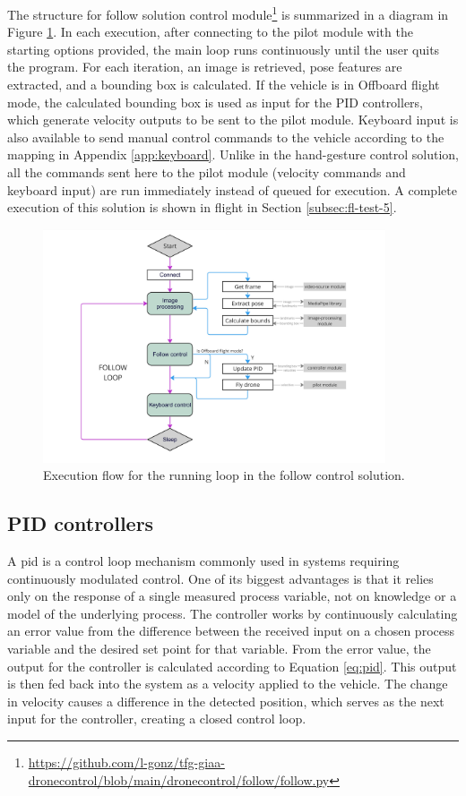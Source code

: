 The structure for follow solution control module\footnote{\url{https://github.com/l-gonz/tfg-giaa-dronecontrol/blob/main/dronecontrol/follow/follow.py}} is summarized in a diagram in Figure \ref{fig:follow-loop}.
In each execution, after connecting to the pilot module with the starting options provided, the main loop runs continuously until the user quits the program.
For each iteration, an image is retrieved, pose features are extracted, and a bounding box is calculated. If the vehicle is in Offboard flight mode, the calculated bounding box is used as input for the PID controllers, which generate velocity outputs to be sent to the pilot module. Keyboard input is also available to send manual control commands to the vehicle according to the mapping in Appendix \ref{app:keyboard}. Unlike in the hand-gesture control solution, all the commands sent here to the pilot module (velocity commands and keyboard input) are run immediately instead of queued for execution. A complete execution of this solution is shown in flight in Section \ref{subsec:fl-test-5}.

\begin{figure}[H]
  \centering
  \includegraphics[width=0.9\textwidth, keepaspectratio]{img/follow-loop.jpg}
  \caption{Execution flow for the running loop in the follow control solution.}
  \label{fig:follow-loop}
\end{figure}



\subsection{PID controllers}
\label{subsec:pid-tools}

A \acrfull{pid} is a control loop mechanism commonly used in systems requiring continuously modulated control. One of its biggest advantages is that it relies only on the response of a single measured process variable, not on knowledge or a model of the underlying process. The controller works by continuously calculating an error value from the difference between the received input on a chosen process variable and the desired set point for that variable. From the error value, the output for the controller is calculated according to Equation \ref{eq:pid}. This output is then fed back into the system as a velocity applied to the vehicle. The change in velocity causes a difference in the detected position, which serves as the next input for the controller, creating a closed control loop.

